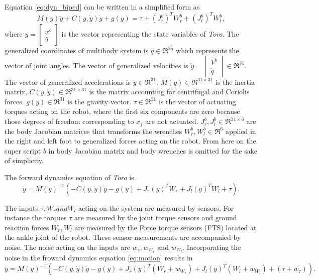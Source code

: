 Equation \ref{eq:dyn_biped} can be written in a simplified form as
\begin{equation} \label{eq:dyn_sbiped}
M(y)\ddot{y} + C(y,\dot{y})\dot{y} + g(y) = \tau + (J_r^b)^T W_r^b + (J_l^b)^T W_l^b,
\end{equation}
where $y = \begin{bmatrix} x^b \\ q \end{bmatrix}$ is the vector representing the state variables of \emph{Toro}. The generalized coordinates of multibody system is $q \in \Re^{25}$ which represents the vector of joint angles. The vector of generalized velocities is $\dot{y}=\begin{bmatrix} V^{b} \\ \dot{q} \end{bmatrix} \in \Re^{31}.$ The vector of generalized accelerations is $\ddot{y}\in \Re^{31}.$  $M(y)\in \Re^{31 \times 31}$ is the inertia matrix, $C(y,\dot{y})\in \Re^{31 \times 31}$ is the matrix accounting for centrifugal and Coriolis forces. $g(y) \in \Re^{31}$ is the gravity vector. $\tau \in \Re^{31}$ is the vector of actuating torques acting on the robot, where the first six components are zero because those degrees of freedom corresponding to $x_f$ are not actuated. $J_r^b,J_l^b \in \Re^{31 \times 6}$ are the body Jacobian matrices that transforms the wrenches $W_r^b,W_l^b \in \Re^{6}$ applied in the right and left foot to generalized forces acting on the robot. From here on the super script $b$ in body Jacobian matrix and body wrenches is omitted for the sake of simplicity.

The forward dynamics equation of \emph{Toro} is
\begin{equation}
	\label{eq:motion}
	\ddot{y} = M(y)^{-1}(-C(y,\dot{y})\dot{y} - g(y) + J_r(y)^{T}W_{r} +J_l(y)^{T}W_{l} + \tau). 
\end{equation}

The inputs $\tau, W_r and W_l$ acting on the system are measured by sensors. For instance the torques $\tau$ are measured by the joint torque sensors and ground reaction forces $W_r,W_l$ are measured by the Force torque sensors (FTS) located at the ankle joint of the robot. These sensor measurements are accompanied by noise. The noise acting on the inputs are $w_\tau,w_{W_r} \text{ and } w_{W_l}$. Incorporating the noise in the froward dynamics equation \ref{eq:motion} results in  
\begin{equation}
	\label{eq:motion_noise}
	\ddot{y} = M(y)^{-1}(-C(y,\dot{y})\dot{y} - g(y) + J_r(y)^{T}(W_{r}+w_{W_r}) +J_l(y)^{T}(W_{l} +w_{W_l})+ (\tau+ w_\tau )). 
\end{equation}

